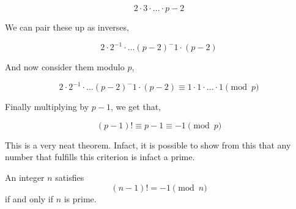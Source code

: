 \[2 \cdot 3 \cdot \dots \cdot p-2\]

We can pair these up as inverses,

\[2 \cdot 2^{-1} \cdot \dots (p-2)^-1 \cdot (p-2)\]

And now consider them modulo \(p\),

\[2 \cdot 2^{-1} \cdot \dots (p-2)^-1 \cdot (p-2) \equiv 1 \cdot 1 \cdot \dots \cdot 1 \pmod{p}\]

Finally multiplying by \(p-1\), we get that,

\[(p-1)! \equiv p-1 \equiv -1 \pmod{p}\]

This is a very neat theorem. Infact, it is possible to show from this that
any number that fulfills this criterion is infact a prime.

\begin{theorem}
    \label{thm: wilson}
    An integer \(n\) satisfies 
    \[(n-1)! = -1 \pmod{n}\]
    if and only if \(n\) is prime.
\end{theorem}




